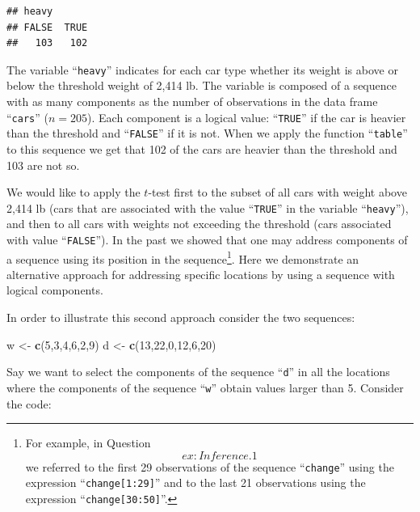 \documentclass[]{krantz}
\makeatletter
\newenvironment{Shaded}{\begin{snugshade}}{\end{snugshade}}
\newcommand{\KeywordTok}[1]{\textcolor[rgb]{0.13,0.29,0.53}{\textbf{#1}}}
\newcommand{\DecValTok}[1]{\textcolor[rgb]{0.00,0.00,0.81}{#1}}
\newcommand{\StringTok}[1]{\textcolor[rgb]{0.31,0.60,0.02}{#1}}
\newcommand{\NormalTok}[1]{#1}
\newenvironment{kframe}{%
\medskip{}
\setlength{\fboxsep}{.8em}
 \def\at@end@of@kframe{}%
 \ifinner\ifhmode%
  \def\at@end@of@kframe{\end{minipage}}%
  \begin{minipage}{\columnwidth}%
 \fi\fi%
 \def\FrameCommand##1{\hskip\@totalleftmargin \hskip-\fboxsep
 \colorbox{shadecolor}{##1}\hskip-\fboxsep
     \hskip-\linewidth \hskip-\@totalleftmargin \hskip\columnwidth}%
 \MakeFramed {\advance\hsize-\width
   \@totalleftmargin\z@ \linewidth\hsize
   \@setminipage}}%
 {\par\unskip\endMakeFramed%
 \at@end@of@kframe}
\renewenvironment{Shaded}{\begin{kframe}}{\end{kframe}}
\theoremstyle{definition}
\theoremstyle{definition}
\theoremstyle{definition}
\theoremstyle{remark}
\makeatother
\begin{document}
\begin{verbatim}
## heavy
## FALSE  TRUE 
##   103   102
\end{verbatim}

The variable ``\texttt{heavy}'' indicates for each car type whether its
weight is above or below the threshold weight of 2,414 lb. The variable
is composed of a sequence with as many components as the number of
observations in the data frame ``\texttt{cars}'' (\(n = 205\)). Each
component is a logical value: ``\texttt{TRUE}'' if the car is heavier
than the threshold and ``\texttt{FALSE}'' if it is not. When we apply
the function ``\texttt{table}'' to this sequence we get that 102 of the
cars are heavier than the threshold and 103 are not so.

We would like to apply the \(t\)-test first to the subset of all cars
with weight above 2,414 lb (cars that are associated with the value
``\texttt{TRUE}'' in the variable ``\texttt{heavy}''), and then to all
cars with weights not exceeding the threshold (cars associated with
value ``\texttt{FALSE}''). In the past we showed that one may address
components of a sequence using its position in the sequence\footnote{For
  example, in Question~\[ex:Inference.1\] we referred to the first 29
  observations of the sequence ``\texttt{change}'' using the expression
  ``\texttt{change{[}1:29{]}}'' and to the last 21 observations using
  the expression ``\texttt{change{[}30:50{]}}''.}. Here we demonstrate
an alternative approach for addressing specific locations by using a
sequence with logical components.

In order to illustrate this second approach consider the two sequences:

\begin{Shaded}
\begin{Highlighting}[]
\NormalTok{w <-}\StringTok{ }\KeywordTok{c}\NormalTok{(}\DecValTok{5}\NormalTok{,}\DecValTok{3}\NormalTok{,}\DecValTok{4}\NormalTok{,}\DecValTok{6}\NormalTok{,}\DecValTok{2}\NormalTok{,}\DecValTok{9}\NormalTok{)}
\NormalTok{d <-}\StringTok{ }\KeywordTok{c}\NormalTok{(}\DecValTok{13}\NormalTok{,}\DecValTok{22}\NormalTok{,}\DecValTok{0}\NormalTok{,}\DecValTok{12}\NormalTok{,}\DecValTok{6}\NormalTok{,}\DecValTok{20}\NormalTok{)}
\end{Highlighting}
\end{Shaded}

Say we want to select the components of the sequence ``\texttt{d}'' in
all the locations where the components of the sequence ``\texttt{w}''
obtain values larger than 5. Consider the code:
\end{document}
